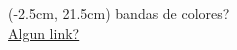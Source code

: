 \documentclass{article}
\begin{document}
\begin{textblock*}{12cm}(-2.5cm, 21.5cm)
	bandas de colores?\\
	\href{https://www.facebook.com/psyjames}{Algun link?}
	
\end{textblock*}
%	
%	
\end{document}
